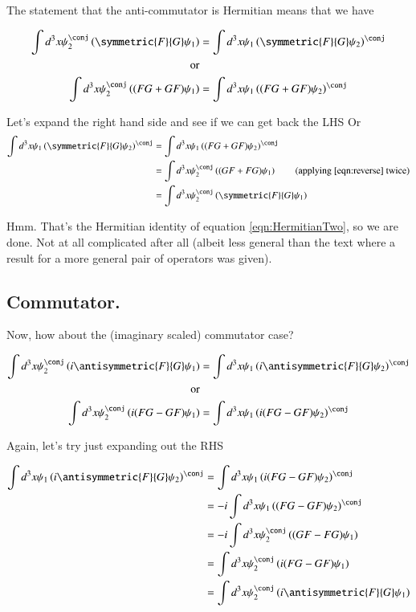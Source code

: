 The statement that the anti-commutator is Hermitian means that we have

\begin{align*}
\int d^3 x \psi_2^\conj \left( \symmetric{F}{G} \psi_1 \right) &= \int d^3 x \psi_1 \left(\symmetric{F}{G} \psi_2 \right)^\conj \\
\text{or} \\
\int d^3 x \psi_2^\conj \left( (F G + G F) \psi_1 \right) &= \int d^3 x \psi_1 \left((F G + G F) \psi_2 \right)^\conj \\
\end{align*}

Let's expand the right hand side and see if we can get back the LHS
Or
\begin{align*}
\int d^3 x \psi_1 \left(\symmetric{F}{G} \psi_2 \right)^\conj 
&=
\int d^3 x \psi_1 \left((F G + G F) \psi_2 \right)^\conj \\
&=
\int d^3 x \psi_2^\conj \left((G F + F G) \psi_1 \right) \quad\quad \text{(applying \ref{eqn:reverse} twice)} \\
&=
\int d^3 x \psi_2^\conj \left( \symmetric{F}{G} \psi_1 \right) \\
\end{align*}

Hmm.  That's the Hermitian identity of equation \ref{eqn:HermitianTwo}, so we are done.  Not at all complicated after all (albeit less
general than the text where a result for a more general pair of operators was given).

\subsection{Commutator. }

Now, how about the (imaginary scaled) commutator case?

\begin{align*}
\int d^3 x \psi_2^\conj \left( i \antisymmetric{F}{G} \psi_1 \right) &= \int d^3 x \psi_1 \left( i \antisymmetric{F}{G} \psi_2 \right)^\conj \\
\text{or} \\
\int d^3 x \psi_2^\conj \left( i(F G - G F) \psi_1 \right) &= \int d^3 x \psi_1 \left(i(F G - G F) \psi_2 \right)^\conj \\
\end{align*}

Again, let's try just expanding out the RHS

\begin{align*}
\int d^3 x \psi_1 \left( i \antisymmetric{F}{G} \psi_2 \right)^\conj 
&= \int d^3 x \psi_1 \left(i(F G - G F) \psi_2 \right)^\conj \\
&= -i \int d^3 x \psi_1 \left((F G - G F) \psi_2 \right)^\conj \\
&= -i \int d^3 x \psi_2^\conj \left((G F - F G) \psi_1 \right) \\
&= \int d^3 x \psi_2^\conj \left(i (F G - G F) \psi_1 \right) \\
&= \int d^3 x \psi_2^\conj \left(i \antisymmetric{F}{G}\psi_1 \right) \\
\end{align*}

